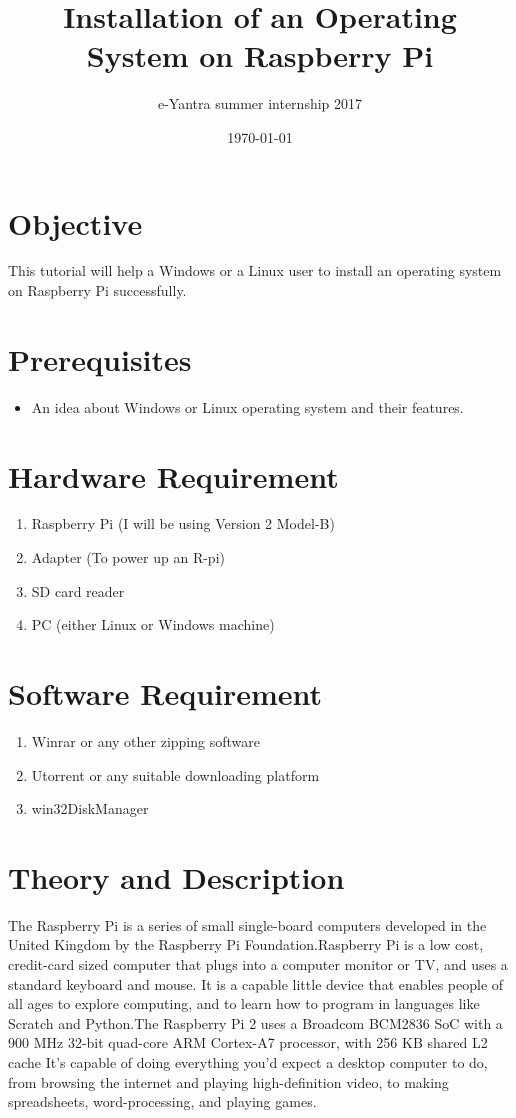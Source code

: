 \documentclass[11pt,a4paper]{report}
\title{Installation of an Operating System on Raspberry Pi }
\author{e-Yantra summer internship 2017}
\date{\today}
\begin{document}
	\maketitle
	\newpage
	\tableofcontents
	\newpage
	\section{Objective}
	This tutorial will help a Windows or a Linux user to install an operating system on Raspberry Pi successfully.
	\section{Prerequisites}
	\begin{itemize}
		\item An idea about Windows or Linux operating system and their features.
	\end{itemize}
	\section{Hardware Requirement}
	\begin{enumerate}
		\item Raspberry Pi (I will be using Version 2 Model-B)
		\item Adapter (To power up an R-pi)
		\item SD card reader
		\item PC (either Linux or Windows machine)
	\end{enumerate}
	\section{Software Requirement}
	\begin{enumerate}
		\item Winrar or any other zipping software 
		\item Utorrent or any suitable downloading platform	
		\item win32DiskManager
	\end{enumerate}
	\newpage
	\section{Theory and Description}
	The Raspberry Pi is a series of small single-board computers developed in the United Kingdom by the Raspberry Pi Foundation.Raspberry Pi is a low cost, credit-card sized computer that plugs into a computer monitor or TV, and uses a standard keyboard and mouse. It is a capable little device that enables people of all ages to explore computing, and to learn how to program in languages like Scratch and Python.The Raspberry Pi 2 uses a Broadcom BCM2836 SoC with a 900 MHz 32-bit quad-core ARM Cortex-A7 processor, with 256 KB shared L2 cache It’s capable of doing everything you’d expect a desktop computer to do, from browsing the internet and playing high-definition video, to making spreadsheets, word-processing, and playing games.
	
\end{document}
